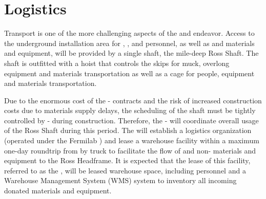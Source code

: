 \section{Logistics}
\label{sec:fdsp-tc-log}


Transport is one of the more challenging aspects of the  and  endeavor.  
Access to the underground installation area for , , and  personnel, as well as   and   materials and equipment, will be provided by a single shaft, the mile-deep Ross Shaft. 
The shaft is outfitted with a hoist that controls the skips for muck, overlong equipment and materials transportation as well as a cage for people, equipment and materials transportation. 

Due to the enormous cost of the - contracts and the risk of increased construction costs due to materials supply delays, the scheduling of the shaft must be tightly controlled by - during construction. Therefore, the -  will coordinate overall usage of the Ross Shaft during this period. The  will establish a logistics organization (operated under the Fermilab ) and lease a warehouse facility within a maximum one-day roundtrip from  by truck to facilitate the flow of   and  non- materials and equipment to the Ross Headframe. It is expected that the lease of this facility, referred to as the , will be leased warehouse space, including personnel and a Warehouse Management System (WMS) system to inventory all incoming donated materials and equipment. 



